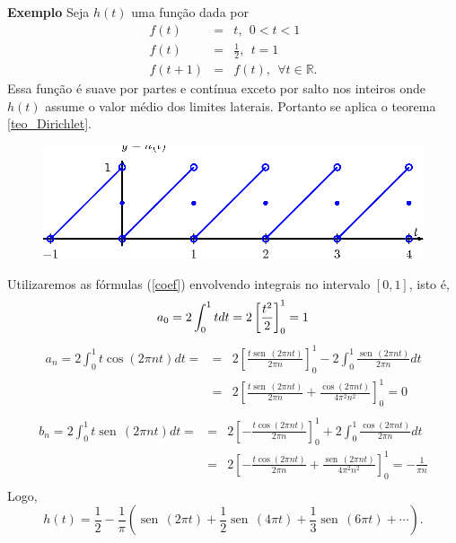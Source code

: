 \documentclass[a4paper,10pt]{book}
\newcommand{\sen}{\operatorname{sen}\,}
\begin{document}
{\bf Exemplo} Seja $h(t)$ uma função dada por
 \begin{eqnarray*}
 f(t)&=&t, \ \ 0<t<1\\
 f(t)&=&\frac{1}{2}, \ \ t=1\\
 f(t+1)&=&f(t),\ \ \forall t\in\mathbb{R}.
 \end{eqnarray*}
 Essa função é suave por partes e contínua exceto por salto nos inteiros onde $h(t)$ assume o valor médio dos limites laterais. Portanto se aplica o teorema \ref{teo_Dirichlet}.
 \begin{figure}[!ht]
 \begin{center}
 \includegraphics{figs/cap_series_figura_5}\end{center}
 \end{figure}
 Utilizaremos as fórmulas (\ref{coef}) envolvendo integrais no intervalo $[0,1]$, isto é,
   \begin{equation*}
    a_0= 2\int_{0}^{1} t dt=2\left[\frac{t^2}{2}\right]_0^1=1\\
 	\end{equation*}
 	\begin{eqnarray*}
    a_n=  2\int_{0}^{1} t\cos(2 \pi n t)dt=&=&2\left[\frac{t\sen(2 \pi n t)}{2 \pi n}\right]_0^1-2\int_0^1\frac{\sen(2 \pi n t)}{2 \pi n}dt\\
 	&=&2\left[\frac{t\sen(2 \pi n t)}{2 \pi n}+\frac{\cos(2 \pi n t)}{4\pi^2 n^2}\right]_0^1=0\\
 	 \end{eqnarray*}
 	\begin{eqnarray*}
    b_n=  2\int_{0}^{1} t\sen(2 \pi n t)dt=&=&2\left[-\frac{t\cos(2 \pi n t)}{2 \pi n}\right]_0^1+2\int_0^1\frac{\cos(2 \pi n t)}{2 \pi n}dt\\
 	&=&2\left[-\frac{t\cos(2 \pi n t)}{2 \pi n}+\frac{\sen(2 \pi n t)}{4\pi^2 n^2}\right]_0^1=-\frac{1}{\pi n}\\
 	 \end{eqnarray*}
 Logo,
 \begin{equation}
 h(t)=\frac{1}{2}-\frac{1}{\pi}\left(\sen(2 \pi t)+\frac{1}{2}\sen(4\pi t)+\frac{1}{3}\sen(6\pi t)+\cdots\right).
 \end{equation}
\end{document}
